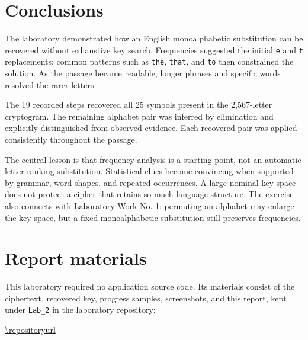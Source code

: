 \section{Conclusions}
The laboratory demonstrated how an English monoalphabetic substitution can be recovered without exhaustive key search. Frequencies suggested the initial \texttt{e} and \texttt{t} replacements; common patterns such as \texttt{the}, \texttt{that}, and \texttt{to} then constrained the solution. As the passage became readable, longer phrases and specific words resolved the rarer letters.

The 19 recorded steps recovered all 25 symbols present in the 2,567-letter cryptogram. The remaining alphabet pair was inferred by elimination and explicitly distinguished from observed evidence. Each recovered pair was applied consistently throughout the passage.

The central lesson is that frequency analysis is a starting point, not an automatic letter-ranking substitution. Statistical clues become convincing when supported by grammar, word shapes, and repeated occurrences. A large nominal key space does not protect a cipher that retains so much language structure. The exercise also connects with Laboratory Work No. 1: permuting an alphabet may enlarge the key space, but a fixed monoalphabetic substitution still preserves frequencies.

\section*{Report materials}
This laboratory required no application source code. Its materials consist of the ciphertext, recovered key, progress samples, screenshots, and this report, kept under \texttt{Lab\_2} in the laboratory repository:
\begin{center}\url{\repositoryurl}\end{center}
